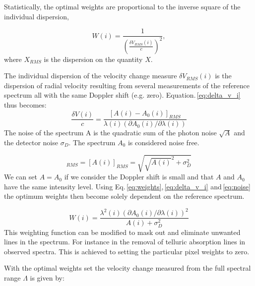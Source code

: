 Statistically, the optimal weights are proportional to the inverse square of the individual dispersion,


\begin{equation}
W(i) = \frac{1}{\left(\frac{\delta V_{RMS}(i)}{c}\right)^2},  \label{eq:weights}
\end{equation}
where $X_{RMS}$ is the dispersion on the quantity $X$.


The individual dispersion of the velocity change measure $\delta V_{RMS}(i)$ is the dispersion of radial velocity resulting from several measurements of the reference spectrum all with the same Doppler shift (e.g. zero). Equation.\,\ref{eq:delta_v_i} thus becomes:
\begin{equation}
    \frac{\delta V(i)}{c} = \frac{{[A(i) - A_0(i)]}_{RMS} }{\lambda(i) (\partial A_0(i)/\partial \lambda(i))} \label{eq:delta_v_i_rms}
\end{equation}
The noise of the spectrum A is the quadratic sum of the photon noise \(\sqrt{A}\) and the detector noise \(\sigma_D\). The spectrum \(A_0\) is considered noise free. 

\begin{equation}
[A(i)-A_0(i)]_{RMS} = [A(i)]_{RMS} = \sqrt{\sqrt{A(i)}^2 + \sigma^2_{D}} \label{eq:noise}
\end{equation}
We can set \(A = A_0\) if we consider the Doppler shift is small and that \(A\) and \(A_0\) have the same intensity level. Using Eq.\,\ref{eq:weights},\,\ref{eq:delta_v_i} and\,\ref{eq:noise}	the optimum weights then become solely dependent on the reference  spectrum.



\begin{equation}
W(i) =   \frac{\lambda^2(i)  (\partial A_0(i)/\partial \lambda(i))^{2}}{A(i) + {\sigma}^{2}_{D}} \label{eq:optimal_weight}
\end{equation} 
This weighting function can be modified to mask out and eliminate unwanted lines in the spectrum. For instance in the removal of telluric absorption lines in observed spectra. This is achieved to setting the particular pixel weights to zero. 

With the optimal weights set the velocity change measured from the full spectral range \(\Lambda\) is given by:



